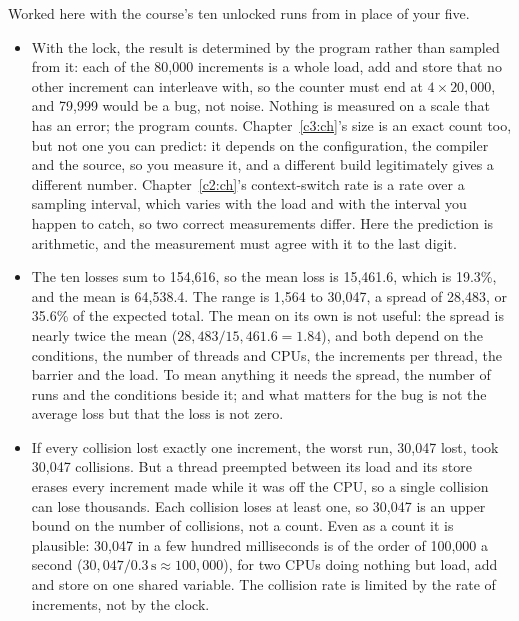  Worked here with the course's ten unlocked runs from  in place of your
five.
\begin{itemize}
  \item With the lock, the result is determined by the program rather than sampled from it: each of
    the 80,000 increments is a whole load, add and store that no other increment can interleave
    with, so the counter must end at $4 \times 20{,}000$, and 79,999 would be a bug, not noise.
    Nothing is measured on a scale that has an error; the program counts. Chapter~\ref{c3:ch}'s
     size is an exact count too, but not one you can predict: it depends on the
    configuration, the compiler and the source, so you measure it, and a different build
    legitimately gives a different number. Chapter~\ref{c2:ch}'s context-switch rate is a rate
    over a sampling interval, which varies with the load and with the interval you happen to catch,
    so two correct measurements differ. Here the prediction is arithmetic, and the measurement must
    agree with it to the last digit.
  \item The ten losses sum to 154,616, so the mean loss is 15,461.6, which is 19.3\%, and the mean
     is 64,538.4. The range is 1,564 to 30,047, a spread of 28,483, or 35.6\% of the
    expected total. The mean on its own is not useful: the spread is nearly twice the mean
    ($28{,}483 / 15{,}461.6 = 1.84$), and both depend on the conditions, the number of threads and
    CPUs, the increments per thread, the barrier and the load. To mean anything it needs the spread,
    the number of runs and the conditions beside it; and what matters for the bug is not the average
    loss but that the loss is not zero.
  \item If every collision lost exactly one increment, the worst run, 30,047 lost, took 30,047
    collisions. But a thread preempted between its load and its store erases every increment made
    while it was off the CPU, so a single collision can lose thousands. Each collision loses at
    least one, so 30,047 is an upper bound on the number of collisions, not a count. Even as a
    count it is plausible: 30,047 in a few hundred milliseconds is of the order of 100,000 a
    second ($30{,}047 / 0.3\,\mathrm{s} \approx 100{,}000$), for two CPUs doing nothing but load,
    add and store on one shared variable. The collision rate is limited by the rate of increments,
    not by the clock.
\end{itemize}

